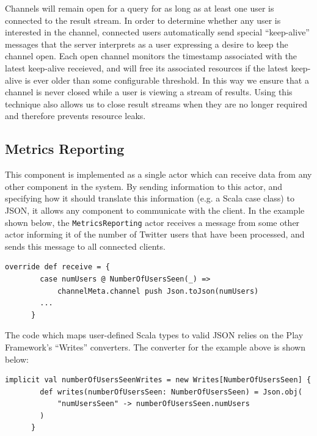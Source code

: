 \documentclass{l4proj}
\newcommand{\code}[1]{\texttt{#1}}
\begin{document}
        Channels will remain open for a query for as long as at least one user is connected to the result stream. In order to determine whether any user is interested in the channel, connected users automatically send special ``keep-alive'' messages that the server interprets as a user expressing a desire to keep the channel open. Each open channel monitors the timestamp associated with the latest keep-alive receieved, and will free its associated resources if the latest keep-alive is ever older than some configurable threshold. In this way we ensure that a channel is never closed while a user is viewing a stream of results. Using this technique also allows us to close result streams when they are no longer required and therefore prevents resource leaks.
        
     
        
    \subsection{Metrics Reporting}
    This component is implemented as a single actor which can receive data from any other component in the system. By sending information to this actor, and specifying how it should translate this information (e.g. a Scala case class) to JSON, it allows any component to communicate with the client. In the example shown below, the \code{MetricsReporting} actor receives a message from some other actor informing it of the number of Twitter users that have been processed, and sends this message to all connected clients.
    
    \begin{lstlisting}[caption=Forwarding new messages through the WebSocket to connected clients.]
      override def receive = {
        case numUsers @ NumberOfUsersSeen(_) => 
            channelMeta.channel push Json.toJson(numUsers)
        ...
      }
    \end{lstlisting}

The code which maps user-defined Scala types to valid JSON relies on the Play Framework's ``Writes'' converters. The converter for the example above is shown below:

    \begin{lstlisting}[caption=Code for conversion of the NumberOfUsersSeen Scala case class to JSON format.]
      implicit val numberOfUsersSeenWrites = new Writes[NumberOfUsersSeen] {
        def writes(numberOfUsersSeen: NumberOfUsersSeen) = Json.obj(
            "numUsersSeen" -> numberOfUsersSeen.numUsers
        )
      }
    \end{lstlisting}
\end{document}
